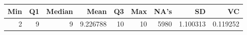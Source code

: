 
\begin{tabular}[t]{rrrrrrrrr}
\toprule
Min & Q1 & Median & Mean & Q3 & Max & NA's & SD & VC\\
\midrule
2 & 9 & 9 & 9.226788 & 10 & 10 & 5980 & 1.100313 & 0.119252\\
\bottomrule
\end{tabular}